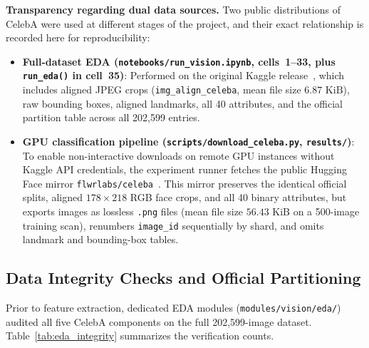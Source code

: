 \documentclass[12pt,a4paper]{article}
\newcommand{\code}[1]{\texttt{#1}}
\begin{document}
\textbf{Transparency regarding dual data sources.} Two public distributions of CelebA were used at different stages of the project, and their exact relationship is recorded here for reproducibility:
\begin{itemize}[leftmargin=18pt, itemsep=2pt]
  \item \textbf{Full-dataset EDA (\code{notebooks/\allowbreak{}run\_\allowbreak{}vision.ipynb}, cells~1--33, plus \code{run\_\allowbreak{}eda()} in cell~35)}: Performed on the original Kaggle release~\cite{celeba_kaggle}, which includes aligned JPEG crops (\code{img\_\allowbreak{}align\_\allowbreak{}celeba}, mean file size $6.87\text{ KiB}$), raw bounding boxes, aligned landmarks, all 40 attributes, and the official partition table across all 202,599 entries.
  \item \textbf{GPU classification pipeline (\code{scripts/\allowbreak{}download\_\allowbreak{}celeba.py}, \code{results/\allowbreak{}})}: To enable non-interactive downloads on remote GPU instances without Kaggle API credentials, the experiment runner fetches the public Hugging Face mirror \code{flwrlabs/\allowbreak{}celeba}~\cite{celeba_hf_mirror}. This mirror preserves the identical official splits, aligned $178 \times 218$ RGB face crops, and all 40 binary attributes, but exports images as lossless \code{.png} files (mean file size $56.43\text{ KiB}$ on a 500-image training scan), renumbers \code{image\_\allowbreak{}id} sequentially by shard, and omits landmark and bounding-box tables.
\end{itemize}

\subsection{Data Integrity Checks and Official Partitioning}
\label{subsec:integrity}

Prior to feature extraction, dedicated EDA modules (\code{modules/\allowbreak{}vision/\allowbreak{}eda/\allowbreak{}}) audited all five CelebA components on the full 202,599-image dataset. Table~\ref{tab:eda_integrity} summarizes the verification counts.
\end{document}
